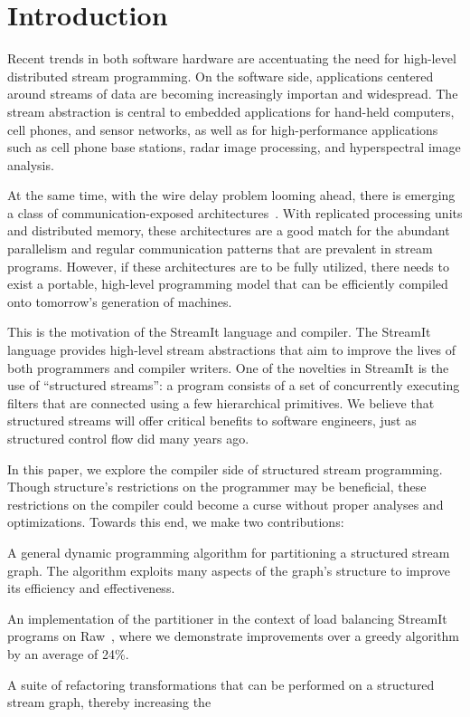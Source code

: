 \section{Introduction}

Recent trends in both software hardware are accentuating the need for
high-level distributed stream programming.  On the software side,
applications centered around streams of data are becoming increasingly
importan and widespread.  The stream abstraction is central to
embedded applications for hand-held computers, cell phones, and sensor
networks, as well as for high-performance applications such as cell
phone base stations, radar image processing, and hyperspectral image
analysis.  

At the same time, with the wire delay problem looming ahead, there is
emerging a class of communication-exposed
architectures~\cite{raw-micro,trips,smartmemories}.  With replicated
processing units and distributed memory, these architectures are a
good match for the abundant parallelism and regular communication
patterns that are prevalent in stream programs.  However, if these
architectures are to be fully utilized, there needs to exist a
portable, high-level programming model that can be efficiently
compiled onto tomorrow's generation of machines.

This is the motivation of the StreamIt language and compiler.  The
StreamIt language provides high-level stream abstractions that aim to
improve the lives of both programmers and compiler writers.  One of
the novelties in StreamIt is the use of ``structured streams'': a
program consists of a set of concurrently executing filters that are
connected using a few hierarchical primitives.  We believe that
structured streams will offer critical benefits to software engineers,
just as structured control flow did many years ago.

In this paper, we explore the compiler side of structured stream
programming.  Though structure's restrictions on the programmer may be
beneficial, these restrictions on the compiler could become a curse
without proper analyses and optimizations.  Towards this end, we make
two contributions:
\begin{item}

\item A general dynamic programming algorithm for partitioning a
structured stream graph.  The algorithm exploits many aspects of the
graph's structure to improve its efficiency and effectiveness.

\item An implementation of the partitioner in the context of load
balancing StreamIt programs on Raw~\cite{raw-micro}, where we
demonstrate improvements over a greedy algorithm by an average of
24\%.

\item A suite of refactoring transformations that can be performed on
a structured stream graph, thereby  increasing the 

\end{item}


